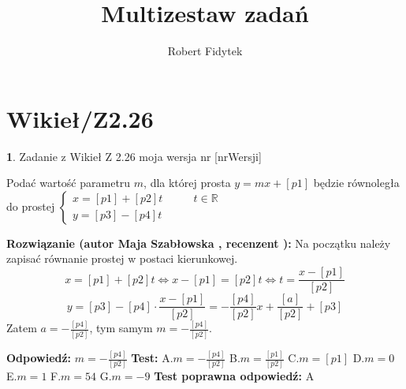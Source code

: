 \documentclass[12pt, a4paper]{article}
\title{Multizestaw zadań}
\author{Robert Fidytek}
\date{}
\theoremstyle{definition} %
\newtheorem{zad}{}
\newcommand{\kategoria}[1]{\section{#1}} %
\newcommand{\zadStart}[1]{\begin{zad}#1\newline} %
\newcommand{\zadStop}{\end{zad}}   %
\newcommand{\rozwStart}[2]{\noindent \textbf{Rozwiązanie (autor #1 , recenzent #2): }\newline} %
\newcommand{\rozwStop}{\newline}                                            %
\newcommand{\odpStart}{\noindent \textbf{Odpowiedź:}\newline}    %
\newcommand{\odpStop}{\newline}                                             %
\newcommand{\testStart}{\noindent \textbf{Test:}\newline} %
\newcommand{\testStop}{\newline} %
\newcommand{\kluczStart}{\noindent \textbf{Test poprawna odpowiedź:}\newline} %
\newcommand{\kluczStop}{\newline} %
\begin{document}
\maketitle


\kategoria{Wikieł/Z2.26}
\zadStart{Zadanie z Wikieł Z 2.26 moja wersja nr [nrWersji]}

Podać wartość parametru $m$, dla której prosta $y=mx+[p1]$ będzie równoległa do prostej $\left\{ \begin{array}{ll}
x=[p1]+[p2]t & \quad \quad t\in\mathbb{R}\\
y=[p3]-[p4]t
\end{array} \right.$
\zadStop

\rozwStart{Maja Szabłowska}{}
Na początku należy zapisać równanie prostej w postaci kierunkowej.
$$x=[p1]+[p2]t \iff x-[p1]=[p2]t \iff t=\frac{x-[p1]}{[p2]}$$
$$y=[p3]-[p4]\cdot\frac{x-[p1]}{[p2]}=-\frac{[p4]}{[p2]}x+\frac{[a]}{[p2]}+[p3]$$
Zatem $a=-\frac{[p4]}{[p2]}$, tym samym $m=-\frac{[p4]}{[p2]}.$
\rozwStop


\odpStart
$m=-\frac{[p4]}{[p2]}$
\odpStop
\testStart
A.$m=-\frac{[p4]}{[p2]}$
B.$m=\frac{[p1]}{[p2]}$
C.$m=[p1]$
D.$m=0$
E.$m=1$
F.$m=54$
G.$m=-9$
\testStop
\kluczStart
A
\kluczStop
\end{document}
